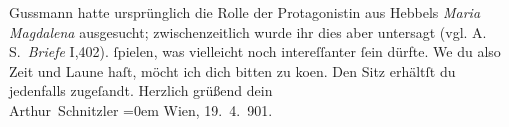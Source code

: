 \begin{ledgroupsized}[t]{13cm}
{{{                     Gussmann hatte ursprünglich die Rolle der Protagonistin aus Hebbels \emph{Maria
                     Magdalena} ausgesucht; zwischenzeitlich wurde ihr dies aber untersagt
                     (vgl. A. S. \emph{Briefe} I,402).}}}\label{K_L01110_2h}{ }ſpielen, was vielleicht noch intereſſanter ſein
               dürfte. We{\geminationn} du also Zeit {\pb}und Laune haſt, möcht
               ich dich bitten zu ko{\geminationm}en. Den Sitz erhältſt du
               jedenfalls zugeſandt.\pend
           \pstart
           Herzlich grüßend dein{\\[\baselineskip]}\spacefill\mbox{Arthur Schnitzler}\pend
           \leftskip=0em{}\pstart
           Wien, 19. 4. 901.\pend
           
         
         \endnumbering{}\end{ledgroupsized}  \newcommand{\dateiname}{L01110}\newcommand{\titel}{Arthur Schnitzler an Hermann Bahr, 19. 4. 1901}\newcommand{\editorInnen}{ Kurt Ifkovits,  Martin Anton Müller}
      